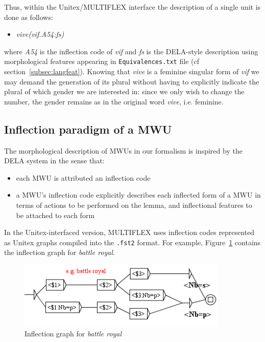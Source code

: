 \bigskip
\noindent Thus, within the Unitex/MULTIFLEX interface the description of a
single unit is done as follows:

\begin{itemize}
\item \emph{vive(vif.A54:fs)}
\end{itemize} 

\bigskip
\noindent where \emph{A54} is the inflection code of \emph{vif} and \emph{fs} is the DELA-style 
description using morphological features appearing in \verb+Equivalences.txt+
file (cf section~\ref{subsec:langfeat}). Knowing that \emph{vive} is a feminine
singular form of \emph{vif} we may demand the generation of its plural without having to 
explicitly indicate the plural of which gender we are interested in: since we only wish to 
change the number, the gender remains as in the original word \emph{vive}, i.e. feminine.

\subsection{Inflection paradigm of a MWU}
\label{subsec:paradigm}
The morphological description of MWUs in our formalism is inspired by the DELA system in the sense that:

\begin{itemize}
\item each MWU is attributed an inflection code
\item a MWU's inflection code explicitly describes each inflected form of a MWU in terms 
of actions to be performed on the lemma, and inflectional features to be attached to each form  
\end{itemize}

\bigskip
\noindent In the Unitex-interfaced version, MULTIFLEX uses inflection codes
represented as Unitex graphs compiled into the \verb+.fst2+ format. For example,
Figure~\ref{fig:BattleRoyal} contains the inflection graph for \emph{battle royal}.

\begin{figure}[!htb]
  \centering
  \includegraphics[width=10cm]{resources/img/BattleRoyal.png}
  \caption{Inflection graph for \emph{battle royal}}
  \label{fig:BattleRoyal}
\end{figure}

